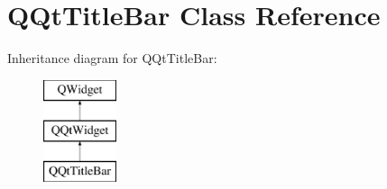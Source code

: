 \hypertarget{class_q_qt_title_bar}{}\section{Q\+Qt\+Title\+Bar Class Reference}
\label{class_q_qt_title_bar}
Inheritance diagram for Q\+Qt\+Title\+Bar\+:\begin{figure}[H]
\begin{center}
\leavevmode
\includegraphics[height=3.000000cm]{class_q_qt_title_bar}
\end{center}
\end{figure}
